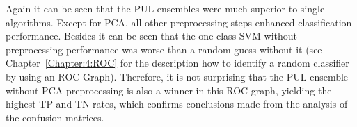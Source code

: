 Again it can be seen that the PUL ensembles were much superior to single algorithms. Except for PCA, all other preprocessing steps enhanced classification performance. Besides it can be seen that the one-class SVM without preprocessing  performance was worse than a random guess without it (see Chapter~\ref{Chapter:4:ROC} for the description how to identify a random classifier by using an ROC Graph). Therefore, it is not surprising that the PUL ensemble without PCA preprocessing is also a winner in this ROC graph, yielding the highest TP and TN rates, which confirms conclusions made from the analysis of the confusion matrices.








 